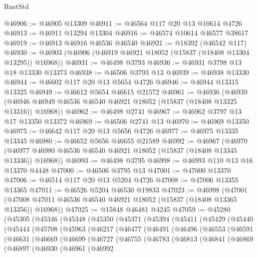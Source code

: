 \begin{lexlean}{RustStd}
\begin{coremodule}
@46906 := @46905 @13309
@46911 := @46564 @117 @20 @13 @10614 @4726
@46913 := @46911 @13294 @13304
@46916 := @46574 @10614 @46577 @38617
@46919 := @46913 @46916 @46536 @46540
@46921 := @18392 (@46542 @117)
@46930 := @46903 (@46906 (@46919 @46921 @18052 (@15837 (@18408 @13304 @13295)) @16968))
@46931 := @46498 @3793
@46936 := @46931 @3798 @13 @18 @13330 @13373
@46938 := @46506 @3793 @13
@46939 := @46938 @13330
@46944 := @46602 @117 @20 @13 @5654 @4726
@46946 := @46944 @13315 @13325
@46949 := @46612 @5654 @46615 @21572
@46961 := @46936
    (@46939 (@46946 @46949 @46536 @46540 @46921 @18052 (@15837 (@18408 @13325 @13316)) @16968))
@46962 := @46498 @2741
@46967 := @46962 @3797 @13 @17 @13350 @13372
@46969 := @46506 @2741 @13
@46970 := @46969 @13350
@46975 := @46642 @117 @20 @13 @5656 @4726
@46977 := @46975 @13335 @13345
@46980 := @46652 @5656 @46655 @21589
@46992 := @46967
    (@46970 (@46977 @46980 @46536 @46540 @46921 @18052 (@15837 (@18408 @13345 @13336)) @16968))
@46993 := @46498 @3795
@46998 := @46993 @110 @13 @16 @13370 @4448
@47000 := @46506 @3795 @13
@47001 := @47000 @13370
@47006 := @46514 @117 @20 @13 @5204 @4726
@47008 := @47006 @13355 @13365
@47011 := @46526 @5204 @46530 @19833
@47023 := @46998
    (@47001 (@47008 @47011 @46536 @46540 @46921 @18052 (@15837 (@18408 @13365 @13356)) @16968))
@47025 := @15848 @46481 @4245
@47059 := @45280
    (@45305
      (@45346
        (@45348
          (@45350
            (@45371
              (@45394
                (@45411
                  (@45429
                    (@45440
                      (@45444
                        (@45708
                          (@45963
                            (@46217
                              (@46477
                                (@46491
                                  (@46496
                                    (@46553
                                      (@46591
                                        (@46631
                                          (@46669
                                            (@46699
                                              (@46727
                                                (@46755
                                                  (@46783
                                                    (@46813
                                                      (@46841
                                                        (@46869
                                                          (@46897
                                                            (@46930
                                                              (@46961
                                                                (@46992

\end{coremodule}
\end{lexlean}
